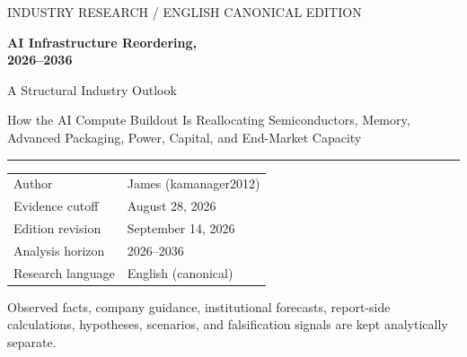 \begin{titlepage}
\thispagestyle{empty}
\vspace*{14mm}

{\sffamily\fontsize{10}{12}\selectfont\color{ReportMuted}\MakeUppercase{Industry Research / English Canonical Edition}\par}

\vspace{14mm}

{\sffamily\bfseries\fontsize{31}{35}\selectfont\color{ReportNavy}
AI Infrastructure Reordering,\\[3mm]
2026--2036
\par}

\vspace{7mm}

{\sffamily\fontsize{16}{21}\selectfont\color{ReportText}
A Structural Industry Outlook
\par}

\vspace{12mm}

{\sffamily\fontsize{11.5}{16}\selectfont\color{ReportMuted}
How the AI Compute Buildout Is Reallocating Semiconductors, Memory,\\
Advanced Packaging, Power, Capital, and End-Market Capacity
\par}

\vfill

\noindent\color{ReportRule}\rule{\textwidth}{0.8pt}

\vspace{6mm}

\begin{tabular}{@{}ll@{}}
\sffamily\small\color{ReportMuted} Author & \sffamily\small James (kamanager2012) \\[2mm]
\sffamily\small\color{ReportMuted} Evidence cutoff & \sffamily\small August 28, 2026 \\[2mm]
\sffamily\small\color{ReportMuted} Edition revision & \sffamily\small September 14, 2026 \\[2mm]
\sffamily\small\color{ReportMuted} Analysis horizon & \sffamily\small 2026--2036 \\[2mm]
\sffamily\small\color{ReportMuted} Research language & \sffamily\small English (canonical) \\
\end{tabular}\par

\vspace{10mm}

{\sffamily\footnotesize\color{ReportMuted}
Observed facts, company guidance, institutional forecasts, report-side calculations,
hypotheses, scenarios, and falsification signals are kept analytically separate.
\par}

\end{titlepage}

\clearpage
{}
\setcounter{page}{1}
